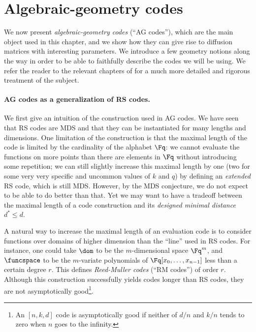 \section{Algebraic-geometry codes}
\label{sec:ag}

We now present \emph{algebraic-geometry codes} (``AG codes''), which are the main object used in this chapter,
and we show how they can give rise to diffusion matrices with interesting parameters.
We introduce a few geometry notions along the way in order to be able to faithfully describe the codes we will
be using. 
We refer the reader to the relevant chapters of \cite{vanlint,tvn,stichtenoth,fulton} for a much more detailed and rigorous treatment of the subject. 

\paragraph{AG codes as a generalization of RS codes.}
We first give an intuition of the construction used in AG codes. We have seen that RS codes are MDS
and that they can be instantiated for many lengths and dimensions. One limitation of the construction
is that the maximal length of the code is limited by the cardinality of the alphabet $\Fq$: we
cannot evaluate the functions on more points than there are elements in $\Fq$ without introducing some
repetition; we can still slightly increase this maximal length by one (two for some
very very specific and uncommon values of $k$ and $q$) by defining an \emph{extended} RS code, which is still MDS. However, by the MDS
conjecture, we do not expect to be able to do better than that.
Yet we may want to
have a tradeoff between the maximal length of a code construction and its \emph{designed minimal distance} $d^* \leq d$.

A natural way to increase the maximal length of an evaluation code is to consider functions over domains
of higher dimension than the ``line'' used in RS codes. For instance, one could take $\dom$ to be the
$m$-dimensional space $\Fq^m$, and $\funcspace$ to be the $m$-variate polynomials of $\Fq[x_0,\ldots,x_{n-1}]$
less than a certain degree $r$. This defines \emph{Reed-Muller codes} (``RM codes'') of order $r$.
Although this construction successfully yields codes longer than RS codes, they are not asymptotically good\footnote{An
$[n, k, d]$ code is asymptotically good if neither of $d/n$ and $k/n$ tends to zero when $n$ goes to the infinity.}.

